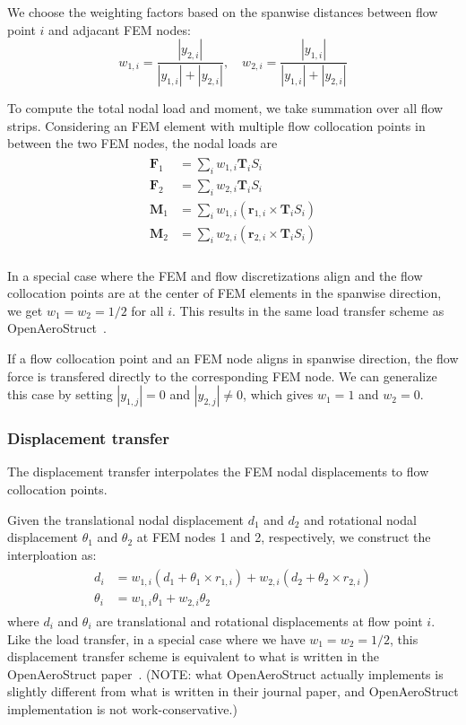 \documentclass[10pt]{article}
\newcommand{\mb}[1]{\boldsymbol{\mathbf{#1}}} %
\begin{document}
We choose the weighting factors based on the spanwise distances between flow point $i$ and adjacant FEM nodes:
\begin{equation}
	w_{1,i} = \frac{|y_{2, i}|}{|y_{1, i}| + |y_{2, i}|}, \quad w_{2,i} = \frac{|y_{1, i}|}{|y_{1, i}| + |y_{2, i}|}
\end{equation}

To compute the total nodal load and moment, we take summation over all flow strips.
Considering an FEM element with multiple flow collocation points in between the two FEM nodes, the nodal loads are
\begin{align}
	\begin{aligned}
		\mb{F}_1 & = \sum_i w_{1,i} \mb{T}_i S_i                                     \\
		\mb{F}_2 & = \sum_i w_{2,i} \mb{T}_i S_i                                     \\
		\mb{M}_1 & = \sum_i w_{1,i} \left( \mb{r}_{1, i} \times \mb{T}_i S_i \right) \\
		\mb{M}_2 & = \sum_i w_{2,i} \left( \mb{r}_{2, i} \times \mb{T}_i S_i \right) \\
	\end{aligned}
\end{align}

In a special case where the FEM and flow discretizations align and the flow collocation points are at the center of FEM elements in the spanwise direction, we get $w_1=w_2 = 1/2$ for all $i$.
This results in the same load transfer scheme as OpenAeroStruct~\cite{Jasa2018a}.

If a flow collocation point and an FEM node aligns in spanwise direction, the flow force is transfered directly to the corresponding FEM node.
We can generalize this case by setting $|y_{1, j}| = 0$ and $|y_{2, j}| \neq 0$, which gives $w_1 = 1$ and $w_2 = 0$.

\subsubsection{Displacement transfer}
The displacement transfer interpolates the FEM nodal displacements to flow collocation points.

Given the translational nodal displacement $d_1$ and $d_2$ and rotational nodal displacement $\theta_1$ and $\theta_2$ at FEM nodes 1 and 2, respectively, we construct the interploation as:
\begin{align}
	\begin{aligned}
		d_i      & = w_{1,i} \left( d_1 + \theta_1 \times r_{1, i} \right) + w_{2,i} \left( d_2 + \theta_2 \times r_{2, i} \right) \\
		\theta_i & = w_{1,i} \theta_1 + w_{2,i} \theta_2
	\end{aligned}
\end{align}
where $d_i$ and $\theta_i$ are translational and rotational displacements at flow point $i$.
Like the load transfer, in a special case where we have $w_1=w_2 = 1/2$, this displacement transfer scheme is equivalent to what is written in the OpenAeroStruct paper~\citep{Jasa2018a}.
(NOTE: what OpenAeroStruct actually implements is slightly different from what is written in their journal paper, and OpenAeroStruct implementation is not work-conservative.)
\end{document}
